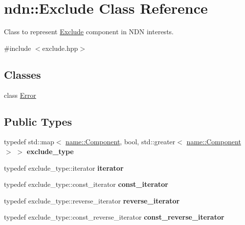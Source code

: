 \hypertarget{classndn_1_1Exclude}{}\section{ndn\+:\+:Exclude Class Reference}
\label{classndn_1_1Exclude}


Class to represent \hyperlink{classndn_1_1Exclude}{Exclude} component in N\+DN interests.  




{\ttfamily \#include $<$exclude.\+hpp$>$}

\subsection*{Classes}
\begin{DoxyCompactItemize}
\item 
class \hyperlink{classndn_1_1Exclude_1_1Error}{Error}
\end{DoxyCompactItemize}
\subsection*{Public Types}
\begin{DoxyCompactItemize}
\item 
typedef std\+::map$<$ \hyperlink{classndn_1_1name_1_1Component}{name\+::\+Component}, bool, std\+::greater$<$ \hyperlink{classndn_1_1name_1_1Component}{name\+::\+Component} $>$ $>$ {\bfseries exclude\+\_\+type}\hypertarget{classndn_1_1Exclude_a1ffe364df07e7fc14273394edd1f9fa4}{}\label{classndn_1_1Exclude_a1ffe364df07e7fc14273394edd1f9fa4}

\item 
typedef exclude\+\_\+type\+::iterator {\bfseries iterator}\hypertarget{classndn_1_1Exclude_a96f38ae98b7c40164b3cd3d6bb03b98b}{}\label{classndn_1_1Exclude_a96f38ae98b7c40164b3cd3d6bb03b98b}

\item 
typedef exclude\+\_\+type\+::const\+\_\+iterator {\bfseries const\+\_\+iterator}\hypertarget{classndn_1_1Exclude_a8b744db6f29688c5330a3fd8764f2532}{}\label{classndn_1_1Exclude_a8b744db6f29688c5330a3fd8764f2532}

\item 
typedef exclude\+\_\+type\+::reverse\+\_\+iterator {\bfseries reverse\+\_\+iterator}\hypertarget{classndn_1_1Exclude_a95ede27544d748e99c30a120c89aea4f}{}\label{classndn_1_1Exclude_a95ede27544d748e99c30a120c89aea4f}

\item 
typedef exclude\+\_\+type\+::const\+\_\+reverse\+\_\+iterator {\bfseries const\+\_\+reverse\+\_\+iterator}\hypertarget{classndn_1_1Exclude_ac9f7c1522a1fc8148e5c74476e7ceb1c}{}\label{classndn_1_1Exclude_ac9f7c1522a1fc8148e5c74476e7ceb1c}

\end{DoxyCompactItemize}
